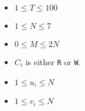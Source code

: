 \begin{itemize}
\tightlist
\item $1 \leq T \leq 100$
\item $1 \leq N \leq 7$
\item $0 \leq M \leq 2N$
\item $C_i$ is either \verb+R+ or \verb+W+.
\item $1 \leq u_i \le N$
\item $1 \leq v_i \le N$
\end{itemize}
\newpage
